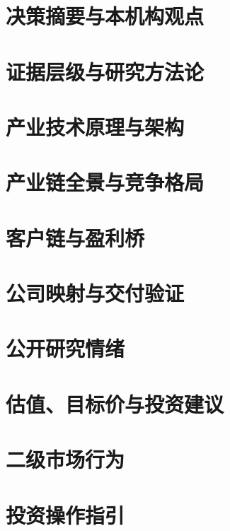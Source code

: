 \documentclass[a4paper,11pt,openany,fontset=none]{ctexrep}
\begin{document}
\astockcover

\tableofcontents
\clearpage

\chapter{决策摘要与本机构观点}


\chapter{证据层级与研究方法论}


\chapter{产业技术原理与架构}


\chapter{产业链全景与竞争格局}


\chapter{客户链与盈利桥}


\chapter{公司映射与交付验证}


\chapter{公开研究情绪}


\chapter{估值、目标价与投资建议}


\chapter{二级市场行为}


\chapter{投资操作指引}

\end{document}
